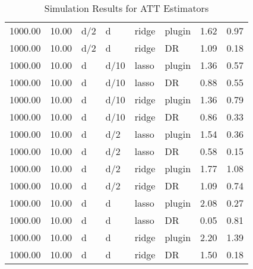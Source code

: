 \begin{table}[ht]
\begin{tabular}{rrllllrr}
  1000.00 & 10.00 & d/2 & d & ridge & plugin & 1.62 & 0.97 \\ 
  1000.00 & 10.00 & d/2 & d & ridge & DR & 1.09 & 0.18 \\ 
  1000.00 & 10.00 & d & d/10 & lasso & plugin & 1.36 & 0.57 \\ 
  1000.00 & 10.00 & d & d/10 & lasso & DR & 0.88 & 0.55 \\ 
  1000.00 & 10.00 & d & d/10 & ridge & plugin & 1.36 & 0.79 \\ 
  1000.00 & 10.00 & d & d/10 & ridge & DR & 0.86 & 0.33 \\ 
  1000.00 & 10.00 & d & d/2 & lasso & plugin & 1.54 & 0.36 \\ 
  1000.00 & 10.00 & d & d/2 & lasso & DR & 0.58 & 0.15 \\ 
  1000.00 & 10.00 & d & d/2 & ridge & plugin & 1.77 & 1.08 \\ 
  1000.00 & 10.00 & d & d/2 & ridge & DR & 1.09 & 0.74 \\ 
  1000.00 & 10.00 & d & d & lasso & plugin & 2.08 & 0.27 \\ 
  1000.00 & 10.00 & d & d & lasso & DR & 0.05 & 0.81 \\ 
  1000.00 & 10.00 & d & d & ridge & plugin & 2.20 & 1.39 \\ 
  1000.00 & 10.00 & d & d & ridge & DR & 1.50 & 0.18 \\ 
   \hline
\end{tabular}
\caption{Simulation Results for ATT Estimators} 
\label{tab:sim_results}
\end{table}
